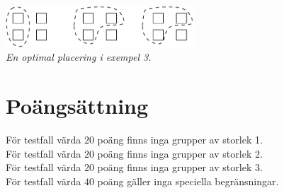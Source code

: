 \includegraphics[width=7cm]{tunnelbana3.pdf}\\
{\em En optimal placering i exempel 3.}

\section*{Poängsättning}
För testfall värda $20$ poäng finns inga grupper av storlek 1.\\
För testfall värda $20$ poäng finns inga grupper av storlek 2.\\
För testfall värda $20$ poäng finns inga grupper av storlek 3.\\
För testfall värda $40$ poäng gäller inga speciella begränsningar.
